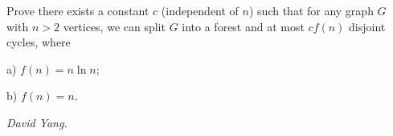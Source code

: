 Prove there exists a constant $c$ (independent of $n$) such that for any graph $G$ with $n>2$ vertices, we can split $G$ into a forest and at most $cf(n)$ disjoint cycles, where

a) $f(n)=n\ln{n}$;

b) $f(n)=n$.

\textit{David Yang.}